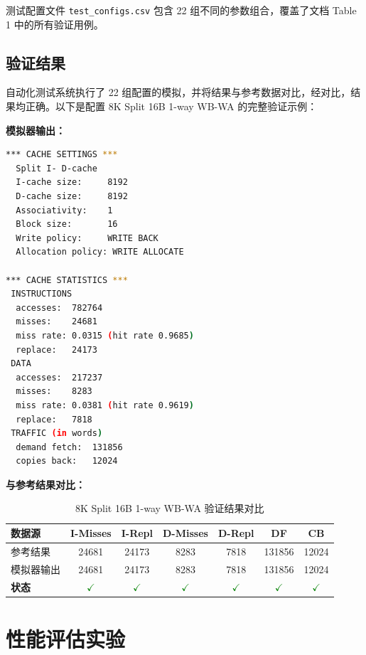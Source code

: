 \documentclass[12pt,a4paper]{article}
\begin{document}
测试配置文件 \texttt{test\_configs.csv} 包含 22 组不同的参数组合，覆盖了文档 Table 1 中的所有验证用例。

\clearpage
\subsection{验证结果}

自动化测试系统执行了 22 组配置的模拟，并将结果与参考数据对比，经对比，结果均正确。以下是配置 8K Split 16B 1-way WB-WA 的完整验证示例：

\textbf{模拟器输出：}

\begin{lstlisting}[language=bash]
*** CACHE SETTINGS ***
  Split I- D-cache
  I-cache size:     8192
  D-cache size:     8192
  Associativity:    1
  Block size:       16
  Write policy:     WRITE BACK
  Allocation policy: WRITE ALLOCATE

*** CACHE STATISTICS ***
 INSTRUCTIONS
  accesses:  782764
  misses:    24681
  miss rate: 0.0315 (hit rate 0.9685)
  replace:   24173
 DATA
  accesses:  217237
  misses:    8283
  miss rate: 0.0381 (hit rate 0.9619)
  replace:   7818
 TRAFFIC (in words)
  demand fetch:  131856
  copies back:   12024
\end{lstlisting}

\textbf{与参考结果对比：}

\begin{table}[H]
\centering
\caption{8K Split 16B 1-way WB-WA 验证结果对比}
\small
\begin{tabular}{lcccccc}
\toprule
\textbf{数据源} & \textbf{I-Misses} & \textbf{I-Repl} & \textbf{D-Misses} & \textbf{D-Repl} & \textbf{DF} & \textbf{CB} \\
\midrule
参考结果 & 24681 & 24173 & 8283 & 7818 & 131856 & 12024 \\
模拟器输出 & 24681 & 24173 & 8283 & 7818 & 131856 & 12024 \\
\textbf{状态} & \textcolor{green}{$\checkmark$} & \textcolor{green}{$\checkmark$} & \textcolor{green}{$\checkmark$} & \textcolor{green}{$\checkmark$} & \textcolor{green}{$\checkmark$} & \textcolor{green}{$\checkmark$} \\
\bottomrule
\end{tabular}
\end{table}


\clearpage
\section{性能评估实验}
\end{document}
